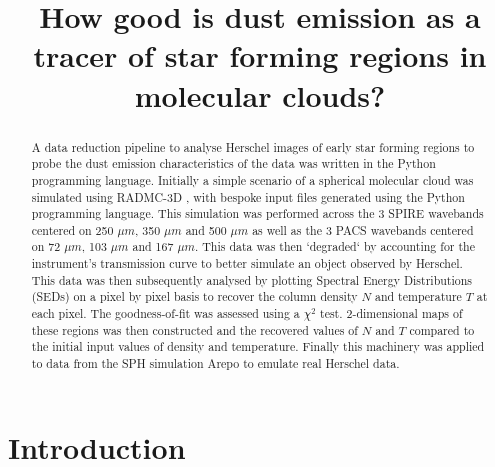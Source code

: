 \documentclass{report}
\title{\vspace{-15mm}\fontsize{24pt}{10pt}\selectfont\textbf{How good is dust emission as a tracer of star forming regions in molecular clouds?}} %
\author{
\large
\textsc{\parbox{\linewidth}{\centering%
Tomas James\endgraf\skip
Student ID: 1158976\endgraf\bigskip}} %
\vspace{-5mm}
}
\date{\large\parbox{\linewidth}{\centering%
  Supervisor: Dr. P. C. Clark \endgraf\bigskip\today}}
\begin{document}
\maketitle %

\thispagestyle{fancy} %


\begin{abstract}
A data reduction pipeline to analyse Herschel images of early star forming regions to probe the dust emission characteristics of the data was written in the Python programming language. Initially a simple scenario of a spherical molecular cloud was simulated using RADMC-3D \parencite{RADMC-3D}, with bespoke input files generated using the Python programming language. This simulation was performed across the 3 SPIRE \parencite{SPIRE} wavebands centered on 250 $\mu m$, 350 $\mu m$ and 500 $\mu m$ as well as the 3 PACS \parencite{PACS} wavebands centered on 72 $\mu m$, 103 $\mu m$ and 167 $\mu m$. This data was then `degraded` by accounting for the instrument's transmission curve to better simulate an object observed by Herschel. This data was then subsequently analysed by plotting Spectral Energy Distributions (SEDs) on a pixel by pixel basis to recover the column density $N$ and temperature $T$ at each pixel. The goodness-of-fit was assessed using a $\chi^{2}$ test. 2-dimensional maps of these regions was then constructed and the recovered values of $N$ and $T$ compared to the initial input values of density and temperature. Finally this machinery was applied to data from the SPH simulation Arepo to emulate real Herschel data.
\end{abstract}


\tableofcontents %
\pagebreak %


\section{Introduction}
\end{document}
